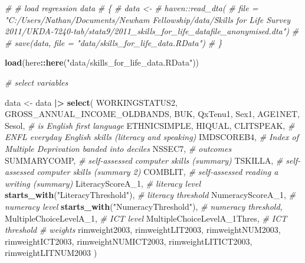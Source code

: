 \documentclass[
]{article}
\newenvironment{Shaded}{\begin{snugshade}}{\end{snugshade}}
\newcommand{\CommentTok}[1]{\textcolor[rgb]{0.56,0.35,0.01}{\textit{#1}}}
\newcommand{\FunctionTok}[1]{\textcolor[rgb]{0.13,0.29,0.53}{\textbf{#1}}}
\newcommand{\NormalTok}[1]{#1}
\newcommand{\OtherTok}[1]{\textcolor[rgb]{0.56,0.35,0.01}{#1}}
\newcommand{\SpecialCharTok}[1]{\textcolor[rgb]{0.81,0.36,0.00}{\textbf{#1}}}
\newcommand{\StringTok}[1]{\textcolor[rgb]{0.31,0.60,0.02}{#1}}
\begin{document}
\begin{Shaded}
\begin{Highlighting}[]
\CommentTok{\# \# load regression data}
\CommentTok{\# \{}
\CommentTok{\#   data \textless{}{-}}
\CommentTok{\#     haven::read\_dta(}
\CommentTok{\#       file = "C:/Users/Nathan/Documents/Newham Fellowship/data/Skills for Life Survey 2011/UKDA{-}7240{-}tab/stata9/2011\_skills\_for\_life\_datafile\_anonymised.dta")}
\CommentTok{\#}
\CommentTok{\#   save(data, file = "data/skills\_for\_life\_data.RData")}
\CommentTok{\# \}}


\FunctionTok{load}\NormalTok{(here}\SpecialCharTok{::}\FunctionTok{here}\NormalTok{(}\StringTok{"data/skills\_for\_life\_data.RData"}\NormalTok{))}

\CommentTok{\# select variables}

\NormalTok{data }\OtherTok{\textless{}{-}}
\NormalTok{  data }\SpecialCharTok{|\textgreater{}}
  \FunctionTok{select}\NormalTok{(}
\NormalTok{    WORKINGSTATUS2,}
\NormalTok{    GROSS\_ANNUAL\_INCOME\_OLDBANDS,}
\NormalTok{    BUK,}
\NormalTok{    QxTenu1,}
\NormalTok{    Sex1,}
\NormalTok{    AGE1NET,}
\NormalTok{    Sesol,              }\CommentTok{\# is English first language}
\NormalTok{    ETHNICSIMPLE,}
\NormalTok{    HIQUAL,}
\NormalTok{    CLITSPEAK,          }\CommentTok{\# ENFL everyday English skills (literacy and speaking)}
\NormalTok{    IMDSCOREB4,         }\CommentTok{\# Index of Multiple Deprivation banded into deciles}
\NormalTok{    NSSEC7,}
    \CommentTok{\# outcomes}
\NormalTok{    SUMMARYCOMP,        }\CommentTok{\# self{-}assessed computer skills (summary)}
\NormalTok{    TSKILLA,            }\CommentTok{\# self{-}assessed computer skills (summary 2)}
\NormalTok{    COMBLIT,            }\CommentTok{\# self{-}assessed reading a writing (summary)}
\NormalTok{    LiteracyScoreA\_1,                  }\CommentTok{\# literacy level}
    \FunctionTok{starts\_with}\NormalTok{(}\StringTok{"LiteracyThreshold"}\NormalTok{),  }\CommentTok{\# literacy threshold}
\NormalTok{    NumeracyScoreA\_1,                  }\CommentTok{\# numeracy level}
    \FunctionTok{starts\_with}\NormalTok{(}\StringTok{"NumeracyThreshold"}\NormalTok{),  }\CommentTok{\# numeracy threshold,}
\NormalTok{    MultipleChoiceLevelA\_1,            }\CommentTok{\# ICT level}
\NormalTok{    MultipleChoiceLevelA\_1Thres,       }\CommentTok{\# ICT threshold}
    \CommentTok{\# weights}
\NormalTok{    rimweight2003,}
\NormalTok{    rimweightLIT2003,}
\NormalTok{    rimweightNUM2003,}
\NormalTok{    rimweightICT2003,}
\NormalTok{    rimweightNUMICT2003,}
\NormalTok{    rimweightLITICT2003,}
\NormalTok{    rimweightLITNUM2003}
\NormalTok{  )}



\end{Highlighting}
\end{Shaded}
\end{document}
